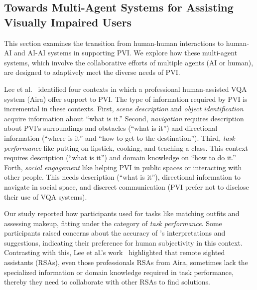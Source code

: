 














\subsection{Towards Multi-Agent Systems for Assisting Visually Impaired Users}


This section examines the transition from human-human interactions to human-AI and AI-AI systems in supporting PVI. We explore how these multi-agent systems, which involve the collaborative efforts of multiple agents (AI or human), are designed to adaptively meet the diverse needs of PVI. 


Lee et al.~\cite{lee2020emerging} identified four contexts in which a professional human-assisted VQA system (Aira) offer support to PVI. The type of information required by PVI is incremental in these contexts. 
First, \textit{scene description} and \textit{object identification} acquire information about ``what is it.''
Second, \textit{navigation} requires description about PVI's surroundings and obstacles (``what is it'') and directional information (``where is it'' and ``how to get to the destination'').
Third, \textit{task performance} like putting on lipstick, cooking, and teaching a class. This context requires description (``what is it'') and domain knowledge on ``how to do it.'' 
Forth, \textit{social engagement} like helping PVI in public spaces or interacting with other people. This needs description (``what is it''), directional information to navigate in social space, and discreet communication (PVI prefer not to disclose their use of VQA systems).


Our study reported how participants used \bma{} for tasks like matching outfits and assessing makeup, fitting under the category of \textit{task performance}. Some participants raised concerns about the accuracy of \sbma's interpretations and suggestions, indicating their preference for human subjectivity in this context. 
% 
Contrasting with this, Lee et al.'s work~\cite{lee2020emerging} highlighted that remote sighted assistants (RSAs), even those professionals RSAs from Aira, sometimes lack the specialized information or domain knowledge required in task performance, thereby they need to collaborate with other RSAs to find solutions. 


